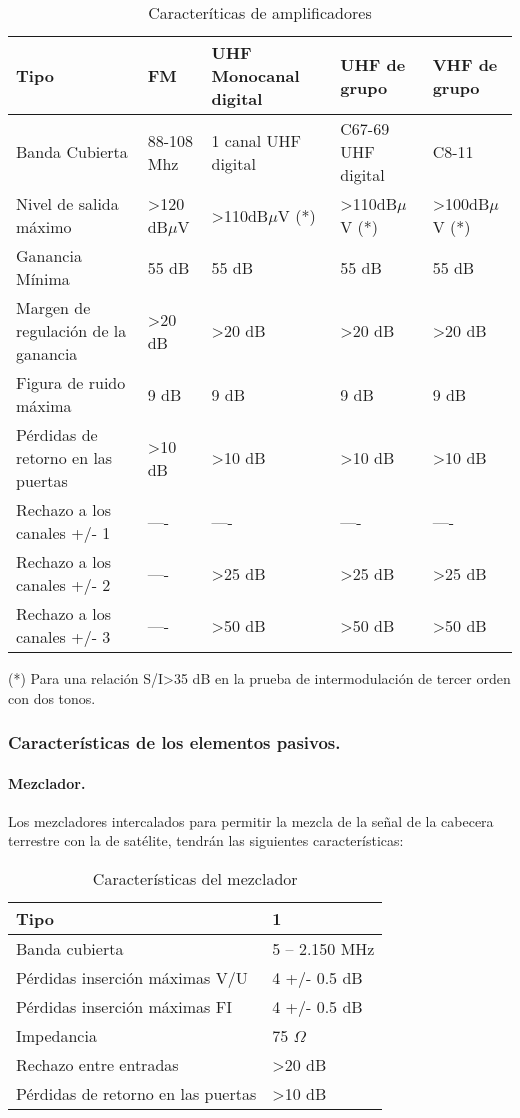 \begin{table}[H]
\caption{Caracteríticas de amplificadores}
\centering
\label{amplis}
\begin{tabular}{l l l l l}
    Tipo & FM & UHF Monocanal digital & UHF de grupo & VHF de grupo\\
\hline
\hline
    Banda Cubierta & 88-108 Mhz & 1 canal UHF digital & C67-69 UHF digital & C8-11\\
    Nivel de salida máximo & >120 dB$\mu$V & >110dB$\mu$V (*) & >110dB$\mu$V (*)& >100dB$\mu$V (*)\\
    Ganancia Mínima & 55 dB & 55 dB & 55 dB & 55 dB \\
    Margen de regulación de la ganancia & >20 dB & >20 dB & >20 dB & >20 dB\\
    Figura de ruido máxima & 9 dB & 9 dB & 9 dB & 9 dB\\
    Pérdidas de retorno en las puertas & >10 dB & >10 dB & >10 dB & >10 dB\\
    Rechazo a los canales +/- 1 & ---- & ---- & ---- & ---- \\
    Rechazo a los canales +/- 2 & ---- & >25 dB & >25 dB & >25 dB \\
    Rechazo a los canales +/- 3 & ---- & >50 dB & >50 dB & >50 dB \\
    
\end{tabular}
\end{table}

(*) Para una relación S/I>35 dB en la prueba de intermodulación de tercer orden con dos tonos.

\subsubsection{Características de los elementos pasivos.}
\paragraph{Mezclador.}

Los mezcladores intercalados para permitir la mezcla de la señal de la cabecera terrestre con la de satélite, tendrán las siguientes características:

\begin{table}[H]
\caption{Características del mezclador}
\centering
\label{mezclador}
\begin{tabular}{l l}
    Tipo & 1\\
\hline
\hline
    Banda cubierta  & 5 – 2.150 MHz \\
    Pérdidas inserción máximas V/U & 4 +/- 0.5 dB\\
    Pérdidas inserción máximas FI & 4 +/- 0.5 dB\\
    Impedancia & 75 $\Omega$\\
    Rechazo entre entradas & >20 dB\\
    Pérdidas de retorno en las puertas & >10 dB
\end{tabular}
\end{table}


